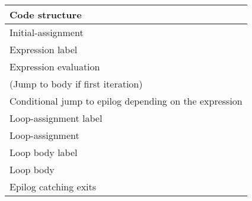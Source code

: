 \documentclass[a4paper]{scrreprt}
\begin{document}
      \begin{table}[hbt]
        \centering
        \begin{tabular}{l}
          \toprule
          \textbf{Code structure}\\
          \midrule
          Initial-assignment\\
          Expression label\\
          Expression evaluation\\
          (Jump to body if first iteration)\\
          Conditional jump to epilog depending on the expression\\
          Loop-assignment label\\
          \hspace{0.5cm} Loop-assignment\\
          Loop body label\\
          \hspace{0.5cm} Loop body\\
          Epilog catching exits\\
          \bottomrule
        \end{tabular}
      \end{table}
    
\end{document}
